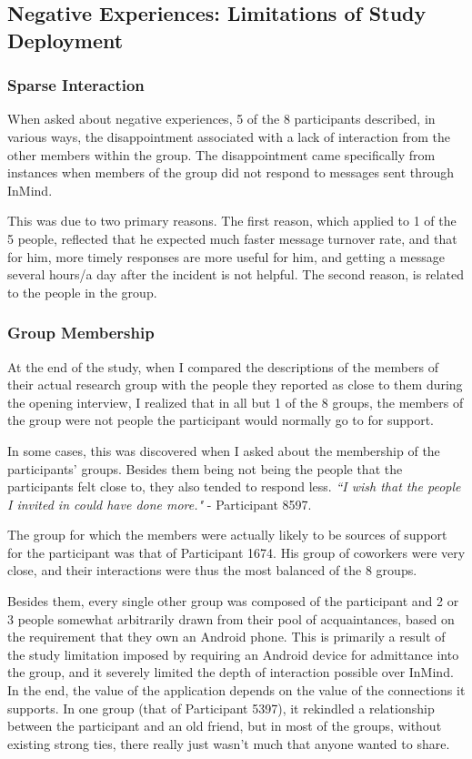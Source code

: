   \subsection{Negative Experiences: Limitations of Study Deployment}
    \subsubsection{Sparse Interaction}
      When asked about negative experiences, 5 of the 8 participants
      described, in various ways, the disappointment associated with
      a lack of interaction from the other members within the group.
      The disappointment came specifically from instances when members of the group
      did not respond to messages sent through InMind.

      This was due to two primary reasons.
      The first reason, which applied to 1 of the 5 people,
      reflected that he expected much faster message turnover rate,
      and that for him,
      more timely responses are more useful for him, and getting a message
      several hours/a day after the incident is not helpful.
      The second reason, is related to the people in the group.
    \subsubsection{Group Membership}
      At the end of the study, when I compared the descriptions of the members
      of their actual research group with the people they reported as close
      to them during the opening interview,
      I realized that in all but 1 of the 8 groups,
      the members of the group were not people the participant would normally
      go to for support.

      In some cases, this was discovered when I asked about the membership of
      the participants' groups.
      Besides them being not being the people
      that the participants felt close to, they also tended to respond less.
      \textit{``I wish that the people I invited in could have done more."}
      - Participant 8597.

      The group for which the members were actually likely to be sources of support
      for the participant was that of Participant 1674.
      His group of coworkers were very close, and their interactions were
      thus the most balanced of the 8 groups.

      Besides them, every single other group was composed of
      the participant and 2 or 3 people somewhat arbitrarily drawn from
      their pool of acquaintances, based on the requirement that
      they own an Android phone.
      This is primarily a result of the study limitation imposed by requiring
      an Android device for admittance into the group,
      and it severely limited the depth of interaction possible over InMind.
      In the end, the value of the application depends on the value
      of the connections it supports.
      In one group (that of Participant 5397), it rekindled a relationship
      between the participant and an old friend,
      but in most of the groups, without existing strong ties,
      there really just wasn't much that anyone wanted to share.

